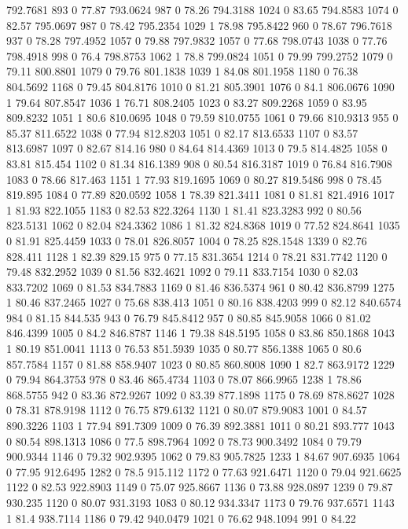 792.7681	893	0	77.87
793.0624	987	0	78.26
794.3188	1024	0	83.65
794.8583	1074	0	82.57
795.0697	987	0	78.42
795.2354	1029	1	78.98
795.8422	960	0	78.67
796.7618	937	0	78.28
797.4952	1057	0	79.88
797.9832	1057	0	77.68
798.0743	1038	0	77.76
798.4918	998	0	76.4
798.8753	1062	1	78.8
799.0824	1051	0	79.99
799.2752	1079	0	79.11
800.8801	1079	0	79.76
801.1838	1039	1	84.08
801.1958	1180	0	76.38
804.5692	1168	0	79.45
804.8176	1010	0	81.21
805.3901	1076	0	84.1
806.0676	1090	1	79.64
807.8547	1036	1	76.71
808.2405	1023	0	83.27
809.2268	1059	0	83.95
809.8232	1051	1	80.6
810.0695	1048	0	79.59
810.0755	1061	0	79.66
810.9313	955	0	85.37
811.6522	1038	0	77.94
812.8203	1051	0	82.17
813.6533	1107	0	83.57
813.6987	1097	0	82.67
814.16	980	0	84.64
814.4369	1013	0	79.5
814.4825	1058	0	83.81
815.454	1102	0	81.34
816.1389	908	0	80.54
816.3187	1019	0	76.84
816.7908	1083	0	78.66
817.463	1151	1	77.93
819.1695	1069	0	80.27
819.5486	998	0	78.45
819.895	1084	0	77.89
820.0592	1058	1	78.39
821.3411	1081	0	81.81
821.4916	1017	1	81.93
822.1055	1183	0	82.53
822.3264	1130	1	81.41
823.3283	992	0	80.56
823.5131	1062	0	82.04
824.3362	1086	1	81.32
824.8368	1019	0	77.52
824.8641	1035	0	81.91
825.4459	1033	0	78.01
826.8057	1004	0	78.25
828.1548	1339	0	82.76
828.411	1128	1	82.39
829.15	975	0	77.15
831.3654	1214	0	78.21
831.7742	1120	0	79.48
832.2952	1039	0	81.56
832.4621	1092	0	79.11
833.7154	1030	0	82.03
833.7202	1069	0	81.53
834.7883	1169	0	81.46
836.5374	961	0	80.42
836.8799	1275	1	80.46
837.2465	1027	0	75.68
838.413	1051	0	80.16
838.4203	999	0	82.12
840.6574	984	0	81.15
844.535	943	0	76.79
845.8412	957	0	80.85
845.9058	1066	0	81.02
846.4399	1005	0	84.2
846.8787	1146	1	79.38
848.5195	1058	0	83.86
850.1868	1043	1	80.19
851.0041	1113	0	76.53
851.5939	1035	0	80.77
856.1388	1065	0	80.6
857.7584	1157	0	81.88
858.9407	1023	0	80.85
860.8008	1090	1	82.7
863.9172	1229	0	79.94
864.3753	978	0	83.46
865.4734	1103	0	78.07
866.9965	1238	1	78.86
868.5755	942	0	83.36
872.9267	1092	0	83.39
877.1898	1175	0	78.69
878.8627	1028	0	78.31
878.9198	1112	0	76.75
879.6132	1121	0	80.07
879.9083	1001	0	84.57
890.3226	1103	1	77.94
891.7309	1009	0	76.39
892.3881	1011	0	80.21
893.777	1043	0	80.54
898.1313	1086	0	77.5
898.7964	1092	0	78.73
900.3492	1084	0	79.79
900.9344	1146	0	79.32
902.9395	1062	0	79.83
905.7825	1233	1	84.67
907.6935	1064	0	77.95
912.6495	1282	0	78.5
915.112	1172	0	77.63
921.6471	1120	0	79.04
921.6625	1122	0	82.53
922.8903	1149	0	75.07
925.8667	1136	0	73.88
928.0897	1239	0	79.87
930.235	1120	0	80.07
931.3193	1083	0	80.12
934.3347	1173	0	79.76
937.6571	1143	1	81.4
938.7114	1186	0	79.42
940.0479	1021	0	76.62
948.1094	991	0	84.22
